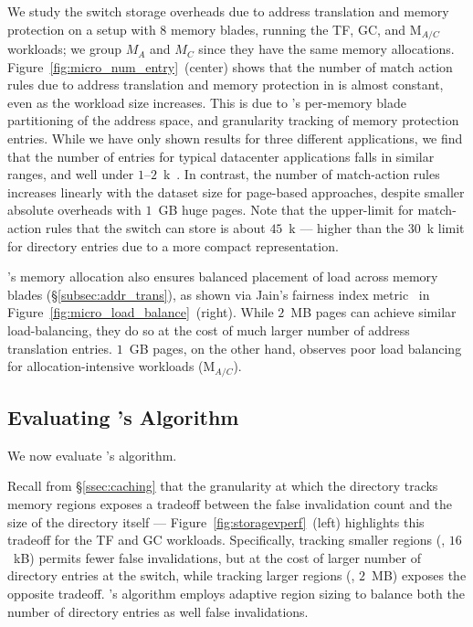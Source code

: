  We study the switch storage overheads due to address translation and memory protection on a setup with 8 memory blades, running the TF, GC, and M$_{A/C}$ workloads; we group $M_A$ and $M_C$ since they have the same memory allocations. Figure~\ref{fig:micro_num_entry}~(center) shows that the number of match action rules due to address translation and memory protection in \mind is almost constant, even as the workload size increases. This is due to \mind's per-memory blade partitioning of the address space, and  granularity tracking of memory protection entries. While we have only shown results for three different applications, we find that the number of  entries for typical datacenter applications falls in similar ranges, and well under $1$--$2$~k~\cite{vma1, vma2}. In contrast, the number of match-action rules increases linearly with the dataset size for page-based approaches, despite smaller absolute overheads with $1$~GB huge pages. Note that the upper-limit for match-action rules that the switch can store is about $45$~k --- higher than the $30$~k limit for directory entries due to a more compact representation.

\mind's memory allocation also ensures balanced placement of load across memory blades (\S\ref{subsec:addr_trans}), as shown via Jain's fairness index metric~\cite{jain} in Figure~\ref{fig:micro_load_balance}~(right). While $2$~MB pages can achieve similar load-balancing, they do so at the cost of much larger number of address translation entries. $1$~GB pages, on the other hand, observes poor load balancing for allocation-intensive workloads (M$_{A/C}$).

\subsection{Evaluating \mind's \Algo Algorithm}
\label{ssec:mindsensitivity}

We now evaluate \mind's \algo algorithm.

 Recall from \S\ref{ssec:caching} that the granularity at which the directory tracks memory regions exposes a tradeoff between the false invalidation count and the size of the directory itself --- Figure~\ref{fig:storagevperf}~(left) highlights this tradeoff for the TF and GC workloads. Specifically, tracking smaller regions (\eg, $16$~kB) permits fewer false invalidations, but at the cost of larger number of directory entries at the switch, while tracking larger regions (\eg, $2$~MB) exposes the opposite tradeoff. \mind's \algo algorithm employs adaptive region sizing to balance both the number of directory entries as well false invalidations.

